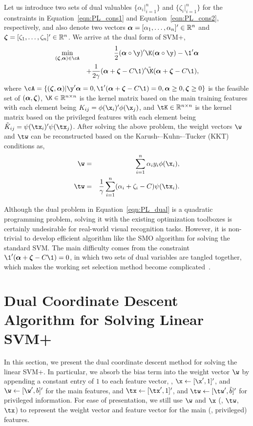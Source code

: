 Let us introduce two sets of dual valuables $\{\alpha_i|_{i=1}^n\}$ and  $\{\zeta_i|_{i=1}^n\}$ for the constraints in Equation~\ref{eqn:PL_cons1} and Equation~\ref{eqn:PL_cons2}, respectively, and also denote two vectors $\bm{\alpha} = [\alpha_1, \ldots, \alpha_n]'\in {\mathbb R}^n$ and $\bm{\zeta} = [\zeta_1, \ldots, \zeta_n]'\in {\mathbb R}^n$.  We arrive at the dual form of SVM+,
\begin{eqnarray}\label{eqn:PL_dual}
\min_{(\bz, \ba) \in \cA} && \frac{1}{2}(\ba\circ\y)'\K(\ba\circ\y) -\1'\ba  \\
&& + \frac{1}{2\gamma}(\ba + \bz - C\1)'\tilde{\K}(\ba + \bz - C\1) \nonumber,
\end{eqnarray}
where $\cA = \{(\bz, \ba)| \y'\ba = 0, \1'(\ba+\bz-C\1) = 0, \ba \geq 0, \bz \geq 0\}$ is the feasible set of $(\bm{\alpha}, \bm{\zeta})$, $\K\in \bbR^{n\times n}$ is the kernel matrix based on the  main training features with each element being $K_{ij} = \phi(\x_i)'\phi(\x_j)$, and $\tK\in \bbR^{n\times n}$ is the kernel matrix based on the privileged features with each element being $\tilde{K}_{ij} = \psi(\tx_i)'\psi(\tx_j)$. After solving the above problem, the weight vectors $\w$ and $\tw$ can be reconstructed based on the Karush-–Kuhn-–Tucker (KKT) conditions as,
\begin{eqnarray}
\w &=& \sum_{i=1}^n \alpha_iy_i\phi(\x_i) \label{eqn:equation_w},\\
\tw &=& \frac{1}{\gamma}\sum_{i=1}^n (\alpha_i+\zeta_i - C)\psi(\tx_i) \label{eqn:equation_tw}.
\end{eqnarray}

Although the dual problem in Equation~\ref{eqn:PL_dual} is a quadratic programming problem, solving it with the existing optimization toolboxes is certainly undesirable for real-world visual recognition tasks. However, it is non-trivial to develop efficient algorithm like the SMO algorithm for solving the standard SVM. The main difficulty comes from the constraint $\1'(\ba+\bz-C\1) = 0$, in which two sets of dual variables are tangled together, which makes the working set selection method become complicated~\citep{Pechyony2010}.

\section{Dual Coordinate Descent Algorithm for Solving Linear SVM+}\label{sec:linear_svmplus}
In this section, we present the dual coordinate descent method for solving the linear SVM+. In particular, we absorb the bias term into the weight vector $\w$ by appending a constant entry of $1$ to each feature vector, \ie, $\x\leftarrow [\x', 1]'$, and $\w\leftarrow[\w', b]'$ for the main features, and $\tx\leftarrow [\tx', 1]'$, and $\tw\leftarrow[\tw', \tilde{b}]'$ for privileged information. For ease of presentation, we still use $\w$ and $\x$ (\resp, $\tw$, $\tx$) to represent the weight vector and feature vector for the main (\resp, privileged) features.

